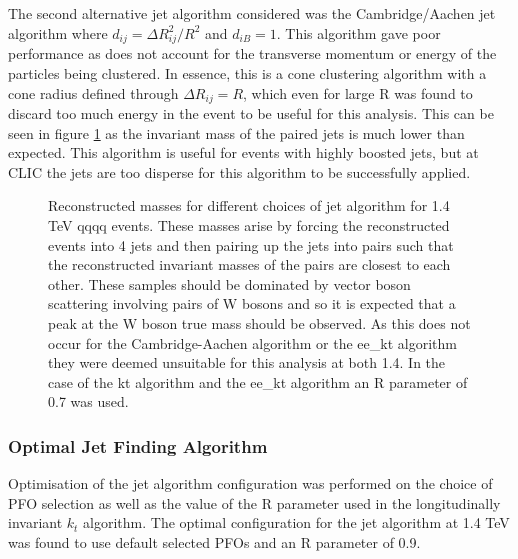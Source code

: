 The second alternative jet algorithm considered was the Cambridge/Aachen jet algorithm where $d_{ij} = {\Delta}R_{ij}^{2}/R^2$ and $d_{iB} = 1$.  This algorithm gave poor performance as does not account for the transverse momentum or energy of the particles being clustered. In essence, this is a cone clustering algorithm with a cone radius defined through ${\Delta}R_{ij} = R$, which even for large R was found to discard too much energy in the event to be useful for this analysis.  This can be seen in figure \ref{fig:invariantmassalgoveto} as the invariant mass of the paired jets is much lower than expected.  This algorithm is useful for events with highly boosted jets, but at CLIC the jets are too disperse for this algorithm to be successfully applied.

\begin{figure}
\centering
{}
\caption[Reconstructed invariant masses for different choices of jet algorithm for 1.4 TeV \nu{\nu}qqqq events.]{Reconstructed masses for different choices of jet algorithm for 1.4 TeV \nu{\nu}qqqq events. These masses arise by forcing the reconstructed events into 4 jets and then pairing up the jets into pairs such that the reconstructed invariant masses of the pairs are closest to each other. These samples should be dominated by vector boson scattering involving pairs of W bosons and so it is expected that a peak at the W boson true mass should be observed. As this does not occur for the Cambridge-Aachen algorithm or the ee\_kt algorithm they were deemed unsuitable for this analysis at both 1.4. In the case of the kt algorithm and the ee\_kt algorithm an R parameter of 0.7 was used.}
\label{fig:invariantmassalgoveto}
\end{figure}


\subsubsection{Optimal Jet Finding Algorithm}
\label{sec:optimaljetalgorithm}
Optimisation of the jet algorithm configuration was performed on the choice of PFO selection as well as the value of the R parameter used in the longitudinally invariant $k_{t}$ algorithm.   The optimal configuration for the jet algorithm at 1.4 TeV was found to use default selected PFOs and an R parameter of 0.9.


